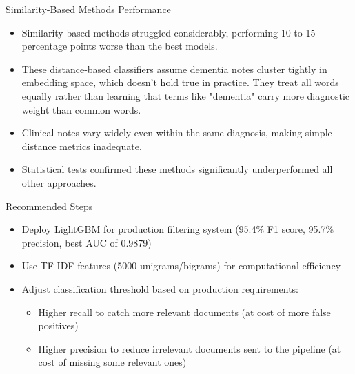 \documentclass[
    10pt,
    aspectratio=169,
]{beamer}
\begin{document}
\begin{frame}{Similarity-Based Methods Performance}
\begin{itemize}
    \item Similarity-based methods struggled considerably, performing 10 to 15 percentage points worse than the best models.
    \item These distance-based classifiers assume dementia notes cluster tightly in embedding space, which doesn't hold true in practice. They treat all words equally rather than learning that terms like "dementia" carry more diagnostic weight than common words.
    \item Clinical notes vary widely even within the same diagnosis, making simple distance metrics inadequate.
    \item Statistical tests confirmed these methods significantly underperformed all other approaches.
\end{itemize}
\end{frame}


\begin{frame}{Recommended Steps}
\begin{itemize}
    \item Deploy LightGBM for production filtering system (95.4\% F1 score, 95.7\% precision, best AUC of 0.9879)
    \item Use TF-IDF features (5000 unigrams/bigrams) for computational efficiency
    \item Adjust classification threshold based on production requirements:
    \begin{itemize}
        \item Higher recall to catch more relevant documents (at cost of more false positives)
        \item Higher precision to reduce irrelevant documents sent to the pipeline (at cost of missing some relevant ones)
    \end{itemize}
\end{itemize}

\end{frame}
\end{document}
